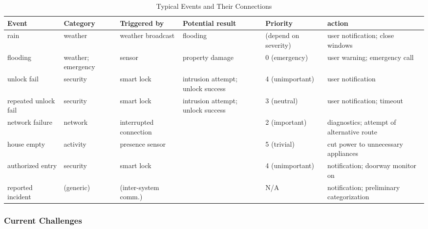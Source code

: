 \documentclass[letterpaper, twocolumn, 10pt, conference]{IEEEtran}
\begin{document}
\begin{table*}[t]
\small
\caption{Typical Events and Their Connections}
\centering
\begin{tabular}{|P{2.5cm}|P{2cm}|P{2.5cm}|P{3cm}|P{2.5cm}|P{2.5cm}|}
	\hline
	       Event         &      Category      &      Triggered by      &         Potential result          &       Priority       &                  action                   \\ \hline\hline
	        rain         &      weather       &   weather broadcast    &             flooding              & (depend on severity) &     user notification; close windows      \\ \hline
	      flooding       & weather; emergency &         sensor         &          property damage          &    0 (emergency)     &       user warning; emergency call        \\ \hline
	    unlock fail      &      security      &       smart lock       & intrusion attempt; unlock success &   4 (unimportant)    &             user notification             \\ \hline
	repeated unlock fail &      security      &       smart lock       & intrusion attempt; unlock success &     3 (neutral)      &        user notification; timeout         \\ \hline
	  network failure    &      network       & interrupted connection &                                   &    2 (important)     & diagnostics; attempt of alternative route \\ \hline
	    house empty      &      activity      &    presence sensor     &                                   &     5 (trivial)      &    cut power to unnecessary appliances    \\ \hline
	  authorized entry   &      security      &       smart lock       &                                   &   4 (unimportant)    &     notification; doorway monitor on      \\ \hline
	 reported incident   &     (generic)      &  (inter-system comm.)  &                                   &         N/A          & notification; preliminary categorization  \\ \hline
\end{tabular} 
\label{table:james}
\end{table*}

\subsubsection{Current Challenges}
\label{sssec:zcy:smart_home:challenges}
\end{document}

